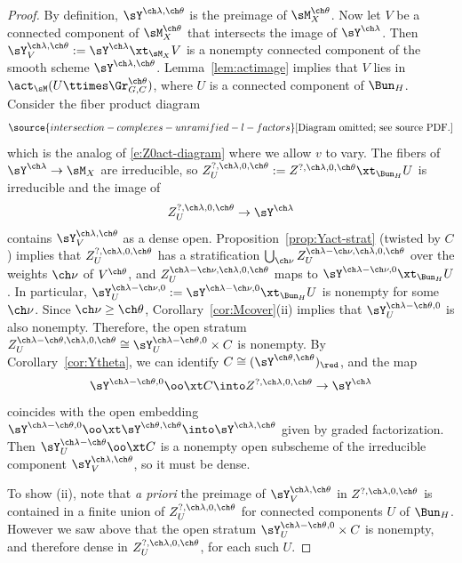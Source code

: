 \begin{proof}
By definition, $\sY^{\ch\lambda,\ch\theta}$ is the preimage
of $\sM^{\ch\theta}_X$. Now let $V$ be a connected component of
$\sM^{\ch\theta}_X$ that intersects the image of $\sY^{\ch\lambda}$.
Then
$\sY^{\ch\lambda,\ch\theta}_V := \sY^{\ch\lambda} \xt_{\sM_X} V$ is
a nonempty connected component of the smooth scheme
$\sY^{\ch\lambda,\ch\theta}$.
Lemma~\ref{lem:actimage} implies that $V$ lies in
$\act_\sM(U \ttimes \Gr^{\ch\theta}_{G,C})$, where $U$ is a connected
component of $\Bun_H$.
Consider the fiber product diagram
\begin{equation}  \label{e:Z0f-diagram}
\source{intersection-complexes-unramified-l-factors}
\text{[Diagram omitted; see source PDF.]}
\end{equation}
which is the analog of \eqref{e:Z0act-diagram} where we allow $v$
to vary.
The fibers of $\sY^{\ch\lambda}\to \sM_X$ are irreducible, so
$Z^{?,\ch\lambda,0,\ch\theta}_U := Z^{?,\ch\lambda,0,\ch\theta} \xt_{\Bun_H} U$ is irreducible and the image of
\[ Z^{?,\ch\lambda,0,\ch\theta}_U \to \sY^{\ch\lambda} \]
contains $\sY^{\ch\lambda,\ch\theta}_V$ as a dense open.
Proposition~\ref{prop:Yact-strat} (twisted by $C$) implies that
$Z^{?,\ch\lambda,0,\ch\theta}_U$ has a stratification
$\bigcup_{\ch\nu} Z^{\ch\lambda-\ch\nu,\ch\lambda,0,\ch\theta}_U$
over the weights $\ch\nu$ of $V^{\ch\theta}$, and
$Z_U^{\ch\lambda-\ch\nu,\ch\lambda,0,\ch\theta}$ maps to
$\sY^{\ch\lambda-\ch\nu,0}\xt_{\Bun_H} U$.
In particular, $\sY^{\ch\lambda-\ch\nu,0}_U := \sY^{\ch\lambda-\ch\nu,0}\xt_{\Bun_H} U$ is nonempty
for some $\ch\nu$. Since $\ch\nu \ge \ch\theta$,
Corollary~\ref{cor:Mcover}(ii) implies that $\sY^{\ch\lambda-\ch\theta,0}_U
$ is also nonempty.
Therefore, the open stratum
$Z_U^{\ch\lambda-\ch\theta,\ch\lambda,0,\ch\theta} \cong
\sY^{\ch\lambda-\ch\theta,0}_U \times C$ is nonempty.
By Corollary~\ref{cor:Ytheta}, we can identify
$C \cong (\sY^{\ch\theta,\ch\theta})_\red$, and
the map
\[ \sY^{\ch\lambda-\ch\theta,0} \oo\xt C \into
Z^{?,\ch\lambda,0,\ch\theta} \to \sY^{\ch\lambda} \]
coincides with the open embedding
$\sY^{\ch\lambda-\ch\theta,0} \oo\xt \sY^{\ch\theta,\ch\theta} \into \sY^{\ch\lambda,\ch\theta}$
given by graded factorization.
Then $\sY^{\ch\lambda-\ch\theta}_U \oo\xt C$ is a nonempty
open subscheme of the irreducible component $\sY^{\ch\lambda,\ch\theta}_V$,
so it must be dense.

To show (ii), note that \emph{a priori}
the preimage of
$\sY^{\ch\lambda,\ch\theta}_V$ in $Z^{?,\ch\lambda,0,\ch\theta}$
is contained in a finite union of
$Z^{?,\ch\lambda,0,\ch\theta}_U$
for connected components $U$ of $\Bun_H$.
However we saw above that the open stratum $\sY^{\ch\lambda-\ch\theta,0}_U \times C$ is nonempty, and therefore dense in $Z^{?,\ch\lambda,0,\ch\theta}_U$,
for each such $U$.
\end{proof}

